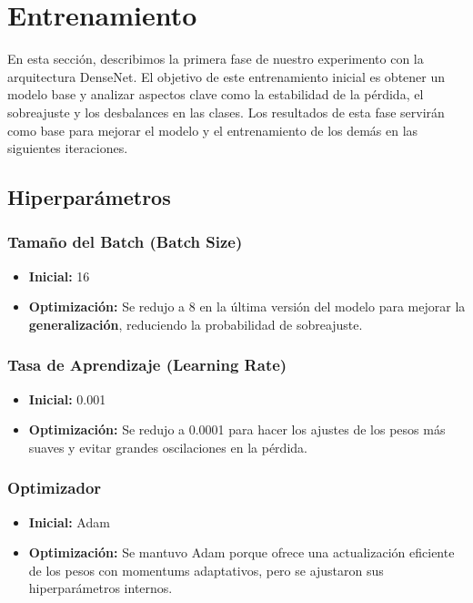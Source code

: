 \section{Entrenamiento}
En esta sección, describimos la primera fase de nuestro experimento con la arquitectura
DenseNet. El objetivo de este entrenamiento inicial es obtener un modelo base
y analizar aspectos clave como la estabilidad de la pérdida, el sobreajuste
y los desbalances en las clases. Los resultados de esta fase servirán como base para
mejorar el modelo y el entrenamiento de los demás en las siguientes iteraciones.


\subsection{Hiperparámetros}
\subsubsection{Tamaño del Batch (Batch Size)}
\begin{itemize}
    \item \textbf{Inicial:} 16
    \item \textbf{Optimización:} Se redujo a 8 en la última versión del modelo para mejorar la \textbf{generalización}, reduciendo la probabilidad de sobreajuste.
\end{itemize}

\subsubsection{Tasa de Aprendizaje (Learning Rate)}
\begin{itemize}
    \item \textbf{Inicial:} 0.001
    \item \textbf{Optimización:} Se redujo a 0.0001 para hacer los ajustes de los pesos más suaves y evitar grandes oscilaciones en la pérdida.
\end{itemize}

\subsubsection{Optimizador}
\begin{itemize}
    \item \textbf{Inicial:} Adam
    \item \textbf{Optimización:} Se mantuvo Adam porque ofrece una actualización eficiente de los pesos con momentums adaptativos, pero se ajustaron sus hiperparámetros internos.
\end{itemize}

